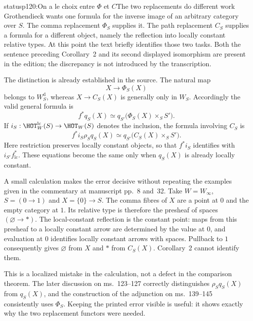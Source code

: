 \begin{dcomment}{status}{p120:On a le choix entre $\Phi$ et $C$}{The two replacements do different work}
Grothendieck wants one formula for the inverse image of an arbitrary category over $S$. The comma replacement $\Phi_S$ supplies it. The path replacement $C_S$ supplies a formula for a different object, namely the reflection into locally constant relative types. At this point the text briefly identifies those two tasks. Both the sentence preceding Corollary~2 and its second displayed isomorphism are present in the edition; the discrepancy is not introduced by the transcription.

The distinction is already established in the source. The natural map
\[
 X\longrightarrow\Phi_S(X)
\]
belongs to $W_S^{\mathrm d}$, whereas $X\longrightarrow C_S(X)$ is generally only in $W_S$. Accordingly the valid general formula is
\[
 f^*q_S(X)\simeq q_{S'}\bigl(\Phi_S(X)\times_S S'\bigr).
\]
If $i_S:\HOT_W^{\mathrm{lc}}(S)\to\HOT_W(S)$ denotes the inclusion, the formula involving $C_S$ is
\[
 f^*i_S\rho_S q_S(X)
 \simeq q_{S'}\bigl(C_S(X)\times_S S'\bigr).
\]
Here restriction preserves locally constant objects, so that $f^*i_S$ identifies with $i_{S'}f^*_{\mathrm{lc}}$. These equations become the same only when $q_S(X)$ is already locally constant.

A small calculation makes the error decisive without repeating the examples given in the commentary at manuscript pp.~8 and~32. Take $W=W_\infty$, $S=(0\to1)$ and $X=\{0\}\to S$. The comma fibres of $X$ are a point at $0$ and the empty category at $1$. Its relative type is therefore the presheaf of spaces $(\varnothing\to *)$. The local-constant reflection is the constant point: maps from this presheaf to a locally constant arrow are determined by the value at $0$, and evaluation at $0$ identifies locally constant arrows with spaces. Pullback to $1$ consequently gives $\varnothing$ from $X$ and $*$ from $C_S(X)$. Corollary~2 cannot identify them.

This is a localized mistake in the calculation, not a defect in the comparison theorem. The later discussion on ms.~123--127 correctly distinguishes $\rho_Sq_S(X)$ from $q_S(X)$, and the construction of the adjunction on ms.~139--145 consistently uses $\Phi_S$. Keeping the printed error visible is useful: it shows exactly why the two replacement functors were needed.
\end{dcomment}

